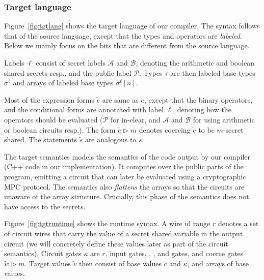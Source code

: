 \subsubsection*{Target language} Figure~\ref{fig:tgtlang} shows the
target language of our compiler. The syntax follows that of the source
language, except that the types and operators are \emph{labeled}. Below
we mainly focus on the bits that are different from the source
language.

Labels $\ell$ consist of secret labels $\mathcal{A}$ and
$\mathcal{B}$, denoting the arithmetic and boolean shared secrets
resp., and the public label $\mathcal{P}$. Types $\tau$ are then
labeled base types $\sigma^{\ell}$ and arrays of labeled base types
$\sigma^{\ell}[n]$.

Most of the expression forms $\widetilde{e}$ are same as $e$, except
that the binary operators, and the conditional forms
are annotated with label $\ell$, denoting how the operators should be
evaluated ($\mathcal{P}$ for in-clear, and $\mathcal{A}$ and
$\mathcal{B}$ for using arithmetic or boolean circuits resp.). The
form $\widetilde{e} \rhd m$ denotes coercing $\widetilde{e}$ to be
$m$-secret shared. The statements $\widetilde{s}$ are analogous to
$s$.

The target semantics models the semantics of the code output by
our compiler (C++ code in our implementation). It computes over the
public parts of the program, emitting a circuit that can later be
evaluated using a cryptographic MPC protocol. The semantics also
\emph{flattens} the arrays so that the circuits are unaware of the
array structure. Crucially, this phase of the semantics does not have
access to the secrets.

Figure~\ref{fig:tgtruntime} shows the runtime syntax. A wire id range
$r$ denotes a set of circuit wires that carry the value of a secret
shared variable in the output circuit (we will concretely define these
values later as part of the circuit semantics). Circuit gates $\kappa$
are $r$, input gates, , , and  gates, and
coerce gates $\widetilde{w} \rhd m$. Target values $\widetilde{v}$
then consist of base values $c$ and $\kappa$, and arrays of base
values.

